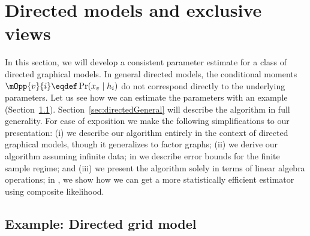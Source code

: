\section{Directed models and exclusive views}
\label{sec:directed}


  In this section, we will develop a consistent parameter estimate for a class of directed graphical models.
  In general directed models, the conditional moments $\mOpp{v}{i} \eqdef \Pr(x_v \mid h_i)$
  do not correspond directly to the underlying parameters.
  Let us see how we can estimate the parameters with an example (Section~\ref{sec:directedExample}).
  Section~\ref{sec:directedGeneral} will describe the algorithm in full generality.
For ease of exposition we make the following simplifications to our presentation:
(i) we describe our algorithm entirely in the context of directed
  graphical models, though it generalizes to factor graphs;
(ii) we derive our algorithm assuming infinite data; in  we 
  describe error bounds for the finite sample regime; and
(iii) we present the algorithm solely in terms of linear algebra operations; in
  , we show how we can get a more statistically
  efficient estimator using composite likelihood.

\subsection{Example: Directed grid model}
\label{sec:directedExample}

%  

